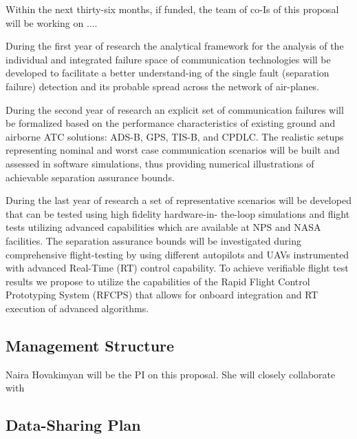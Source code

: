 \documentclass[letter,onecolumn,12pt]{aiaa-tc}
\newcommand{\1}{1_n}
\begin{document}
Within the next thirty-six months, if funded, the team of co-Is of this proposal will be working on ....

During the first year of research the analytical framework for the analysis of the individual and integrated failure space of communication technologies will be developed to facilitate a better understand-ing of the single fault (separation failure) detection and its probable spread across the network of air-planes.

During the second year of research an explicit set of communication failures will be formalized based on the performance characteristics of existing ground and airborne ATC solutions: ADS-B, GPS, TIS-B, and CPDLC. The realistic setups representing nominal and worst case communication scenarios will be built and assessed in software simulations, thus providing numerical illustrations of achievable separation assurance bounds.

During the last year of research a set of representative scenarios will be developed that can be tested using high fidelity hardware-in- the-loop simulations and flight tests utilizing advanced capabilities which are available at NPS and NASA facilities. The separation assurance bounds will be investigated during comprehensive flight-testing by using different autopilots and UAVs instrumented with advanced Real-Time (RT) control capability. To achieve verifiable flight test results we propose to utilize the capabilities of the Rapid Flight Control Prototyping System (RFCPS) that allows for onboard integration and RT execution of advanced algorithms.


\subsection{Management Structure}

Naira Hovakimyan will be the PI on this proposal. She will closely collaborate with


\subsection{Data-Sharing Plan}
\end{document}
